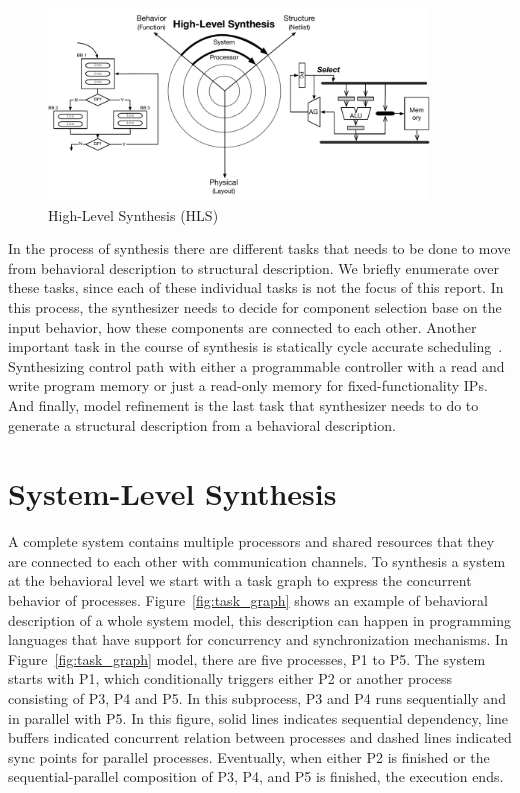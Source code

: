 \begin{figure}[h]
    \centering
    \includegraphics[width=0.9\textwidth]{figures/Introduction/processor-synthesis.pdf}
    \caption{High-Level Synthesis (HLS)}
    \label{fig:proc_synthesis}
\end{figure}

In the process of synthesis there are different tasks that needs to be done to move from behavioral description to structural description.
We briefly enumerate over these tasks, since each of these individual tasks is not the focus of this report.
In this process, the synthesizer needs to decide for component selection base on the input behavior, how these components are connected to each other.
Another important task in the course of synthesis is statically cycle accurate scheduling~\cite{canis_2014_modulo,cong_2009_scheduling,cong_2008_scheduling, cong_2006_efficient}.
Synthesizing control path with either a programmable controller with a read and write program memory or just a read-only memory for fixed-functionality IPs.
And finally, model refinement is the last task that synthesizer needs to do to generate a structural description from a behavioral description.


\section{System-Level Synthesis}

A complete system contains multiple processors and shared resources that they are connected to each other with communication channels.
To synthesis a system at the behavioral level we start with a task graph to express the concurrent behavior of processes.
Figure~\ref{fig:task_graph} shows an example of behavioral description of a whole system model, this description can happen in programming languages that have support for concurrency and synchronization mechanisms.
In Figure~\ref{fig:task_graph} model, there are five processes, P1 to P5.
The system starts with P1, which conditionally triggers either P2 or another process consisting of P3, P4 and P5.
In this subprocess, P3 and P4 runs sequentially and in parallel with P5. In this figure, solid lines indicates sequential dependency, line buffers indicated concurrent relation between processes and dashed lines indicated sync points for parallel processes.
Eventually, when either P2 is finished or the sequential-parallel composition of P3, P4, and P5 is finished, the execution ends.

